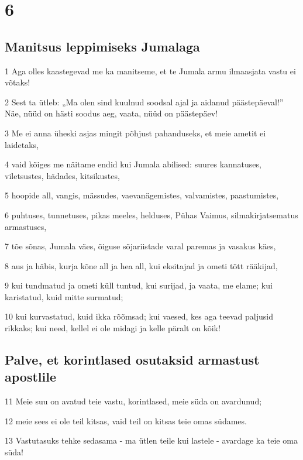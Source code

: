 \chapter{6}

\section*{Manitsus leppimiseks Jumalaga}

\par 1 Aga olles kaastegevad me ka manitseme, et te Jumala armu ilmaasjata vastu ei võtaks!
\par 2 Sest ta ütleb: „Ma olen sind kuulnud soodsal ajal ja aidanud päästepäeval!” Näe, nüüd on hästi soodus aeg, vaata, nüüd on päästepäev!
\par 3 Me ei anna üheski asjas mingit põhjust pahanduseks, et meie ametit ei laidetaks,
\par 4 vaid kõiges me näitame endid kui Jumala abilised: suures kannatuses, viletsustes, hädades, kitsikustes,
\par 5 hoopide all, vangis, mässudes, vaevanägemistes, valvamistes, paastumistes,
\par 6 puhtuses, tunnetuses, pikas meeles, helduses, Pühas Vaimus, silmakirjatsematus armastuses,
\par 7 tõe sõnas, Jumala väes, õiguse sõjariistade varal paremas ja vasakus käes,
\par 8 aus ja häbis, kurja kõne all ja hea all, kui eksitajad ja ometi tõtt rääkijad,
\par 9 kui tundmatud ja ometi küll tuntud, kui surijad, ja vaata, me elame; kui karistatud, kuid mitte surmatud;
\par 10 kui kurvastatud, kuid ikka rõõmsad; kui vaesed, kes aga teevad paljusid rikkaks; kui need, kellel ei ole midagi ja kelle päralt on kõik!

\section*{Palve, et korintlased osutaksid armastust apostlile}

\par 11 Meie suu on avatud teie vastu, korintlased, meie süda on avardunud;
\par 12 meie sees ei ole teil kitsas, vaid teil on kitsas teie omas südames.
\par 13 Vastutasuks tehke sedasama - ma ütlen teile kui lastele - avardage ka teie oma süda!

